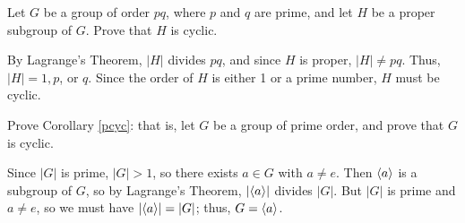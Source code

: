 \begin{exercise} Let $G$ be a group of order $pq$, where $p$
    and $q$ are prime, and let $H$ be a proper subgroup of
    $G$. Prove that $H$ is cyclic.
\end{exercise}

\begin{solution}[print=false]
By Lagrange's Theorem, $|H|$ divides $pq$, and since $H$ is proper, $|H|\neq  pq$.
    Thus, $|H|=1,p$, or $q$. Since the order of $H$ is
    either 1 or a prime number, $H$ must be cyclic.
\end{solution}

\begin{exercise} Prove Corollary \ref{pcyc}: that is, let $G$ be a group of prime order, and prove that $G$ is cyclic. \end{exercise}

\begin{solution}[print=false]
Since $|G|$ is prime, $|G|>1$, so there exists $a\in G$
with $a\neq e$. Then $\langle a\rangle$ is a subgroup of $G$, so by
Lagrange's Theorem, $|\langle a\rangle|$ divides $|G|$.  But $|G|$ is
prime and $a\neq e$, so we must have $|\langle a\rangle|=|G|$; thus,
$G=\langle a\rangle$.\end{solution}

